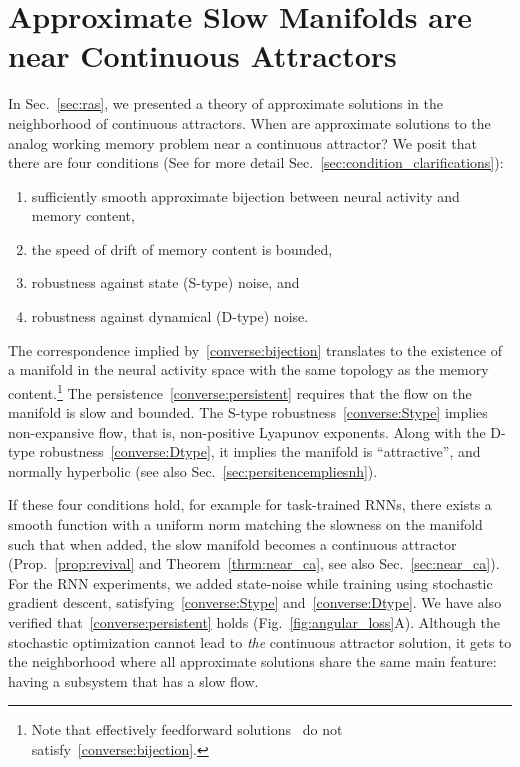 \documentclass{article} %
\newcounter{ct}
\theoremstyle{definition}
\theoremstyle{remark}
\begin{document}
\section{Approximate Slow Manifolds are near Continuous Attractors}\label{sec:converse}
In Sec.~\ref{sec:ras}, we presented a theory of approximate solutions in the neighborhood of continuous attractors.
When are approximate solutions to the analog working memory problem near a continuous attractor?
We posit that there are four conditions (See for more detail Sec.~\ref{sec:condition_clarifications}):
\begin{enumerate}[label=\textbf{(C\arabic*)}]
\item sufficiently smooth approximate bijection between neural activity and memory content,\label{converse:bijection}
\item the speed of drift of memory content is bounded,\label{converse:persistent}
\item robustness against state (S-type) noise, and\label{converse:Stype}
\item robustness against dynamical (D-type) noise.\label{converse:Dtype}
\end{enumerate}
The correspondence implied by~\ref{converse:bijection} translates to the existence of a manifold in the neural activity space with the same topology as the memory content.\footnote{Note that effectively feedforward solutions~\citep{Goldman2009} do not satisfy~\ref{converse:bijection}.}
The persistence~\ref{converse:persistent} requires that the flow on the manifold is slow and bounded.
The S-type robustness~\ref{converse:Stype} implies non-expansive flow, that is, non-positive Lyapunov exponents.
Along with the D-type robustness~\ref{converse:Dtype}, it implies the manifold is ``attractive'', and normally hyperbolic (see also Sec.~\ref{sec:persitencempliesnh}).

If these four conditions hold, for example for task-trained RNNs, there exists a smooth function with a uniform norm matching the slowness on the manifold such that when added, the slow manifold becomes a continuous attractor (Prop.~\ref{prop:revival} and Theorem~\ref{thrm:near_ca}, see also Sec.~\ref{sec:near_ca}).
For the RNN experiments, we added state-noise while training using stochastic gradient descent, satisfying~\ref{converse:Stype} and~\ref{converse:Dtype}.
We have also verified that~\ref{converse:persistent} holds (Fig.~\ref{fig:angular_loss}A).
Although the stochastic optimization cannot lead to \emph{the} continuous attractor solution, it gets to the neighborhood where all approximate solutions share the same main feature: having a subsystem that has a slow flow.
\end{document}
